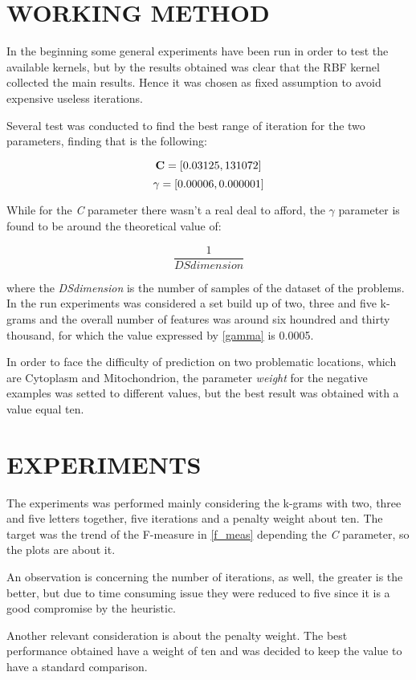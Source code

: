\documentclass{acm_proc_article-sp-sigmod07}
\begin{document}
\section{WORKING METHOD}
In the beginning some general experiments have been run in order to test the
available kernels, but by the results obtained was clear that the RBF kernel
collected the main results. Hence it was chosen as fixed assumption to avoid
expensive useless iterations.

Several test was conducted to find the best range of iteration for the two
parameters, finding that is the following:

$$
	\bold{C} = [0.03125, 131072]
$$
$$
 	\bold{\gamma} = [0.00006, 0.000001]
$$

While for the \emph{C} parameter there wasn't a real deal to afford, the 
$ \gamma $ parameter is found to be around the theoretical value of:

\begin{equation}
\frac{1}{DSdimension}
\label{gamma}
\end{equation}

where the \emph{DSdimension} is the number of samples of the dataset of the
problems. In the run experiments was considered a set build up of two, three and
five k-grams and the overall number of features was around six houndred and 
thirty thousand, for which the value expressed by \ref{gamma} is 0.0005.

In order to face the difficulty of prediction on two problematic locations,
which are Cytoplasm and Mitochondrion, the parameter \emph{weight} for the
negative examples was setted to different values, but the best result was 
obtained with a value equal ten.

\section{EXPERIMENTS}
The experiments was performed mainly considering the k-grams with two, three and
five letters together, five iterations and a penalty weight about ten.
The target was the trend of the F-measure in \ref{f_meas} depending the \emph{C}
parameter, so the plots are about it.

An observation is concerning the number of iterations, as well, the greater is 
the better, but due to time consuming issue they were reduced to five since it
is a good compromise by the heuristic. 

Another relevant consideration is about the penalty weight. The best performance
obtained have a weight of ten and was decided to keep the value to have a standard
comparison.
\end{document}

